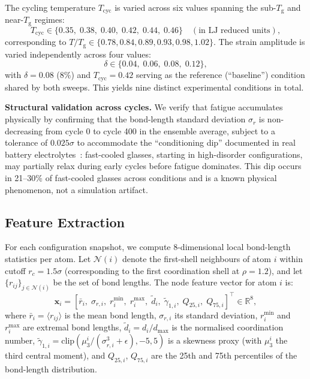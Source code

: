 \documentclass[12pt,a4paper]{article}
\newcommand{\Tg}{T_{\mathrm{g}}}
\newcommand{\Tbat}{T_{\mathrm{cyc}}}
\newcommand{\sigr}{\sigma_r}
\begin{document}
The cycling temperature $\Tbat$ is varied across six values spanning the sub-$\Tg$ and near-$\Tg$ regimes:
\begin{equation}
\Tbat \in \{0.35,\; 0.38,\; 0.40,\; 0.42,\; 0.44,\; 0.46\} \quad (\text{in LJ reduced units}),
\end{equation}
corresponding to $T/\Tg \in \{0.78, 0.84, 0.89, 0.93, 0.98, 1.02\}$.
The strain amplitude is varied independently across four values:
\begin{equation}
\delta \in \{0.04,\; 0.06,\; 0.08,\; 0.12\},
\end{equation}
with $\delta = 0.08$ (8\%) and $\Tbat = 0.42$ serving as the reference (``baseline'') condition shared by both sweeps.
This yields nine distinct experimental conditions in total.

\textbf{Structural validation across cycles.}
We verify that fatigue accumulates physically by confirming that the bond-length standard deviation $\sigr$ is non-decreasing from cycle 0 to cycle 400 in the ensemble average, subject to a tolerance of $0.025\sigma$ to accommodate the ``conditioning dip'' documented in real battery electrolytes~\cite{Sakamoto2013}: fast-cooled glasses, starting in high-disorder configurations, may partially relax during early cycles before fatigue dominates.
This dip occurs in 21--30\% of fast-cooled glasses across conditions and is a known physical phenomenon, not a simulation artifact.

\subsection{Feature Extraction}
\label{sec:features}

For each configuration snapshot, we compute 8-dimensional local bond-length statistics per atom.
Let $\mathcal{N}(i)$ denote the first-shell neighbours of atom $i$ within cutoff $r_c = 1.5\sigma$ (corresponding to the first coordination shell at $\rho = 1.2$), and let $\{r_{ij}\}_{j \in \mathcal{N}(i)}$ be the set of bond lengths.
The node feature vector for atom $i$ is:
\begin{equation}
\mathbf{x}_i = \left[\bar{r}_i,\; \sigma_{r,i},\; r_{i}^{\min},\; r_{i}^{\max},\; \tilde{d}_i,\; \tilde{\gamma}_{1,i},\; Q_{25,i},\; Q_{75,i}\right]^\top \in \mathbb{R}^8,
\label{eq:features}
\end{equation}
where $\bar{r}_i = \langle r_{ij} \rangle$ is the mean bond length, $\sigma_{r,i}$ its standard deviation, $r_i^{\min}$ and $r_i^{\max}$ are extremal bond lengths, $\tilde{d}_i = d_i / d_{\max}$ is the normalised coordination number, $\tilde{\gamma}_{1,i} = \text{clip}(\mu_3^i / (\sigma_{r,i}^3 + \epsilon), -5, 5)$ is a skewness proxy (with $\mu_3^i$ the third central moment), and $Q_{25,i}$, $Q_{75,i}$ are the 25th and 75th percentiles of the bond-length distribution.
\end{document}
